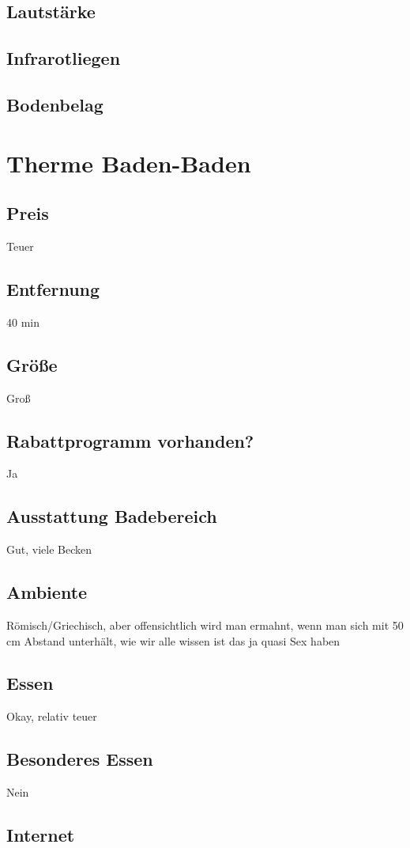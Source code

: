 \documentclass{article}
\begin{document}
\subsection*{Lautstärke}
\subsection*{Infrarotliegen}
\subsection*{Bodenbelag}
\pagebreak

\section*{Therme Baden-Baden}
\subsection*{Preis} Teuer
\subsection*{Entfernung} 40 min
\subsection*{Größe} Groß
\subsection*{Rabattprogramm vorhanden?} Ja
\subsection*{Ausstattung Badebereich} Gut, viele Becken
\subsection*{Ambiente} Römisch/Griechisch, aber offensichtlich wird man ermahnt, wenn man sich mit 50 cm Abstand unterhält, wie wir alle wissen ist das ja quasi Sex haben
\subsection*{Essen} Okay, relativ teuer
\subsection*{Besonderes Essen} Nein
\subsection*{Internet}
\end{document}
